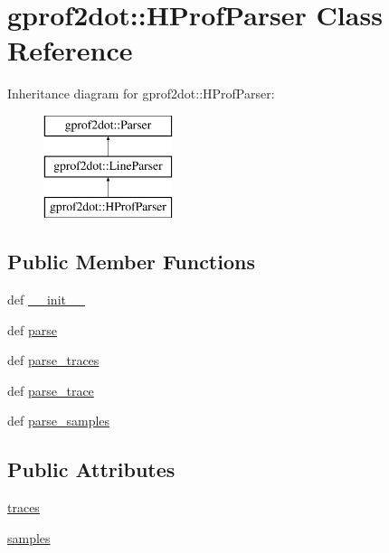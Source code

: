 \hypertarget{classgprof2dot_1_1HProfParser}{
\section{gprof2dot::HProfParser Class Reference}
\label{classgprof2dot_1_1HProfParser}
}
Inheritance diagram for gprof2dot::HProfParser:\begin{figure}[H]
\begin{center}
\leavevmode
\includegraphics[height=3.000000cm]{classgprof2dot_1_1HProfParser}
\end{center}
\end{figure}
\subsection*{Public Member Functions}
\begin{DoxyCompactItemize}
\item 
def \hyperlink{classgprof2dot_1_1HProfParser_a1bc12e0ba546db9789dd34a30ea650ea}{\_\-\_\-init\_\-\_\-}
\item 
def \hyperlink{classgprof2dot_1_1HProfParser_a8f6dc9e1899c27794ccc8676a33d62fa}{parse}
\item 
def \hyperlink{classgprof2dot_1_1HProfParser_ae7545eac0c68cd11916091f500fe41ef}{parse\_\-traces}
\item 
def \hyperlink{classgprof2dot_1_1HProfParser_a82bdb213a803b654111054f7fe2645f2}{parse\_\-trace}
\item 
def \hyperlink{classgprof2dot_1_1HProfParser_a9a8a3aa2a0c23e441b1943f19ef7b10c}{parse\_\-samples}
\end{DoxyCompactItemize}
\subsection*{Public Attributes}
\begin{DoxyCompactItemize}
\item 
\hyperlink{classgprof2dot_1_1HProfParser_af9da484ae6aff23799453b827b926289}{traces}
\item 
\hyperlink{classgprof2dot_1_1HProfParser_a3c0310fc0ef8b98ae09fa94f36f116d5}{samples}
\end{DoxyCompactItemize}
